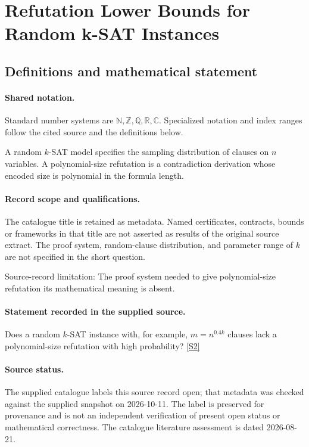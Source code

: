 \documentclass[11pt]{article}
\newcommand{\sref}[2]{\hyperlink{source:#1:#2}{[S#2]}}
\begin{document}
\section{Refutation Lower Bounds for Random k-SAT Instances}\label{statement}

\subsection{Definitions and mathematical statement}

\paragraph{Shared notation.}Standard number systems are $\mathbb N,\mathbb Z,\mathbb Q,\mathbb R,\mathbb C$. Specialized notation and index ranges follow the cited source and the definitions below.


A random $k$-SAT model specifies the sampling distribution of clauses on $n$ variables. A polynomial-size refutation is a contradiction derivation whose encoded size is polynomial in the formula length.
\paragraph{Record scope and qualifications.}
The catalogue title is retained as metadata. Named certificates, contracts, bounds or frameworks in that title are not asserted as results of the original source extract.
The proof system, random-clause distribution, and parameter range of $k$ are not specified in the short question.

Source-record limitation: The proof system needed to give polynomial-size refutation its mathematical meaning is absent.
\paragraph{Statement recorded in the supplied source.}
Does a random $k$-SAT instance with, for example, $m=n^{0.4k}$ clauses lack a polynomial-size refutation with high probability? \sref{statement}{2}
\paragraph{Source status.}
The supplied catalogue labels this source record open; that metadata was checked against the supplied snapshot on 2026-10-11. The label is preserved for provenance and is not an independent verification of present open status or mathematical correctness. The catalogue literature assessment is dated 2026-08-21.
\end{document}
